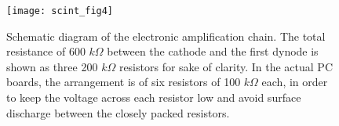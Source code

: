 {%
%
%
\begin{figure}[h]
\begin{center}
  \texttt{[image: scint\_fig4]}
\end{center}
\caption[Aerogel: amplification chain]{
 Schematic diagram of the electronic amplification chain. The total 
 resistance of 600 $k\Omega$ between the cathode and the first dynode is shown 
 as three 200 $k\Omega$ resistors for sake of clarity. In the actual PC boards, 
 the arrangement is of six resistors of 100 $k\Omega$ each, in order to 
 keep the voltage across each resistor low and avoid surface discharge 
 between the closely packed resistors.
 }
\label{fig:aero_fig7}
\end{figure}

} %

